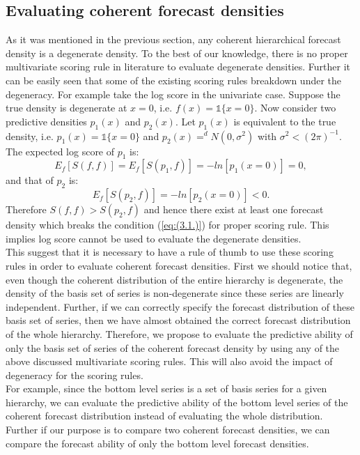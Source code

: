 \documentclass[a4paper, 11pt]{article}
\begin{document}
\subsection{Evaluating coherent forecast densities}

As it was mentioned in the previous section, any coherent hierarchical forecast density is a degenerate density. To the best of our knowledge, there is no proper multivariate scoring rule in literature to evaluate degenerate densities. Further it can be easily seen that some of the existing scoring rules breakdown under the degeneracy. For example take the log score in the univariate case. Suppose the true density is degenerate at $x=0$, i.e. $f(x)=\mathbb{1}\{x=0\}$.  Now consider two predictive densities $p_1(x)$ and $p_2(x)$. Let $p_1(x)$ is equivalent to the true density, i.e. $p_1(x)=\mathbb{1}\{x=0\}$ and $p_2(x) =^d N(0,\sigma^2)$ with $\sigma^2 < (2\pi)^{-1}$. The expected log score of $p_1$ is:
$$E_f[S(f,f)] = E_f[S(p_1,f)] = -ln[p_1(x=0)]=0,$$
\noindent
and that of $p_2$ is:
$$E_f[S(p_2,f)] = -ln[p_2(x=0)]<0.$$ 
\noindent
Therefore $S(f,f) > S(p_2,f)$ and hence there exist at least one forecast density which breaks the condition (\ref{eq:(3.1.)}) for proper scoring rule. This implies log score cannot be used to evaluate the degenerate densities.  \\

\noindent
This suggest that it is necessary to have a rule of thumb to use these scoring rules in order to evaluate coherent forecast densities. First we should notice that, even though the coherent distribution of the entire hierarchy is degenerate, the density of the basis set of series is non-degenerate since these series are linearly independent. Further, if we can correctly specify the forecast distribution of these basis set of series, then we have almost obtained the correct forecast distribution of the whole hierarchy. Therefore, we propose to evaluate the predictive ability of only the basis set of series of the coherent forecast density by using any of the above discussed multivariate scoring rules. This will also avoid the impact of degeneracy for the scoring rules. \\

\noindent
For example, since the bottom level series is a set of basis series for a given hierarchy, we can evaluate the predictive ability of the bottom level series of the coherent forecast distribution instead of evaluating the whole distribution. Further if our purpose is to compare two coherent forecast densities, we can compare the forecast ability of only the bottom level forecast densities. 
\end{document}
